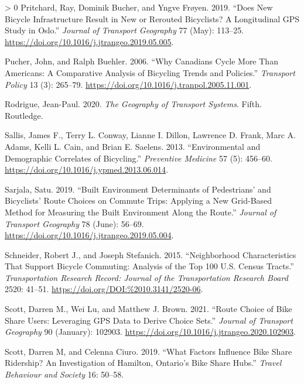 \documentclass[smallextended]{svjour3}       %
\newlength{\cslhangindent}
\newenvironment{CSLReferences}[3] %
 {%
  \setlength{\parindent}{0pt}
  \ifodd #1 \everypar{\setlength{\hangindent}{\cslhangindent}}\ignorespaces\fi
  \ifnum #2 > 0
  \setlength{\parskip}{#2\baselineskip}
  \fi
 }%
 {}
\begin{document}
\begin{CSLReferences}{1}{0}
\leavevmode\hypertarget{ref-Pritchard2019}{}%
Pritchard, Ray, Dominik Bucher, and Yngve Frøyen. 2019. {``Does New
Bicycle Infrastructure Result in New or Rerouted Bicyclists? {A}
Longitudinal {GPS} Study in {Oslo}.''} \emph{Journal of Transport
Geography} 77 (May): 113--25.
\url{https://doi.org/10.1016/j.jtrangeo.2019.05.005}.

\leavevmode\hypertarget{ref-Pucher2006}{}%
Pucher, John, and Ralph Buehler. 2006. {``Why {Canadians} Cycle More
Than {Americans}: {A} Comparative Analysis of Bicycling Trends and
Policies.''} \emph{Transport Policy} 13 (3): 265--79.
\url{https://doi.org/10.1016/j.tranpol.2005.11.001}.

\leavevmode\hypertarget{ref-Rodrigue2020}{}%
Rodrigue, Jean-Paul. 2020. \emph{The Geography of Transport Systems}.
Fifth. Routledge.

\leavevmode\hypertarget{ref-Sallis2013}{}%
Sallis, James F., Terry L. Conway, Lianne I. Dillon, Lawrence D. Frank,
Marc A. Adams, Kelli L. Cain, and Brian E. Saelens. 2013.
{``Environmental and Demographic Correlates of Bicycling.''}
\emph{Preventive Medicine} 57 (5): 456--60.
\url{https://doi.org/10.1016/j.ypmed.2013.06.014}.

\leavevmode\hypertarget{ref-Sarjala2019}{}%
Sarjala, Satu. 2019. {``Built Environment Determinants of Pedestrians'
and Bicyclists' Route Choices on Commute Trips: {Applying} a New
Grid-Based Method for Measuring the Built Environment Along the
Route.''} \emph{Journal of Transport Geography} 78 (June): 56--69.
\url{https://doi.org/10.1016/j.jtrangeo.2019.05.004}.

\leavevmode\hypertarget{ref-Schneider2015}{}%
Schneider, Robert J., and Joseph Stefanich. 2015. {``Neighborhood
Characteristics That Support Bicycle Commuting: {Analysis} of the Top
100 {U}.{S}. Census Tracts.''} \emph{Transportation Research Record:
Journal of the Transportation Research Board} 2520: 41--51.
\url{https://doi.org/DOI:\%2010.3141/2520-06}.

\leavevmode\hypertarget{ref-scottRouteChoiceBike2021}{}%
Scott, Darren M., Wei Lu, and Matthew J. Brown. 2021. {``Route Choice of
Bike Share Users: {Leveraging GPS} Data to Derive Choice Sets.''}
\emph{Journal of Transport Geography} 90 (January): 102903.
\url{https://doi.org/10.1016/j.jtrangeo.2020.102903}.

\leavevmode\hypertarget{ref-Scott2019factors}{}%
Scott, Darren M, and Celenna Ciuro. 2019. {``What Factors Influence Bike
Share Ridership? {An} Investigation of {Hamilton}, {Ontario}'s Bike
Share Hubs.''} \emph{Travel Behaviour and Society} 16: 50--58.


\end{CSLReferences}
\end{document}
